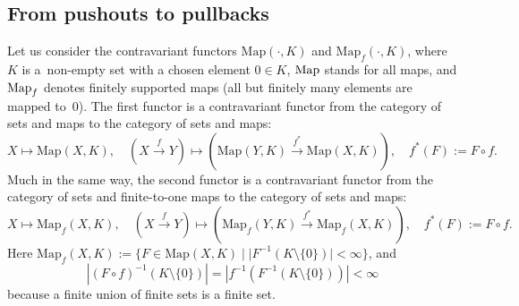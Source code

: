 \documentclass[12pt,times,a4paper]{amsart}
\numberwithin{equation}{section}
\numberwithin{equation}{section}
\begin{document}
\subsection{From pushouts to pullbacks}
Let us consider the contravariant
functors $\mathrm{Map}(\cdot,K)$ and $\mathrm{Map}_f(\cdot,K)$, where $K$ is a~non-empty
 set with a chosen element $0\in K$, ${\rm Map}$ stands for all maps, and ${\rm Map}_f$ denotes finitely supported maps (all but finitely many elements
are mapped to~0). The first functor is
a contravariant functor from the category of sets and maps to the category of sets and maps:
\begin{equation*}
X\longmapsto \mathrm{Map}(X,K),\quad (X\stackrel{f}{\to}Y)\longmapsto
 \left(\mathrm{Map}(Y,K)\stackrel{f^*}{\to}\mathrm{Map}(X,K)\right),\quad f^*(F):=F\circ f.
\end{equation*}
Much in the same way, the second functor is
a contravariant functor from the category of sets and finite-to-one maps to the category of sets and maps:
\begin{equation*}
X\longmapsto \mathrm{Map}_f(X,K),\quad (X\stackrel{f}{\to}Y)\longmapsto
 \left(\mathrm{Map}_f(Y,K)\stackrel{f^*}{\to}\mathrm{Map}_f(X,K)\right),\quad f^*(F):=F\circ f.
\end{equation*}
Here $\mathrm{Map}_f(X,K):=\{F\in\mathrm{Map}(X,K)\;|\;|F^{-1}(K\setminus\{0\})|<\infty \}$,
and
\begin{equation}
|(F\circ f)^{-1}(K\setminus\{0\})|=|f^{-1}(F^{-1}(K\setminus\{0\}))|<\infty
\end{equation}
because a finite union of finite sets is a finite set.
\end{document}
